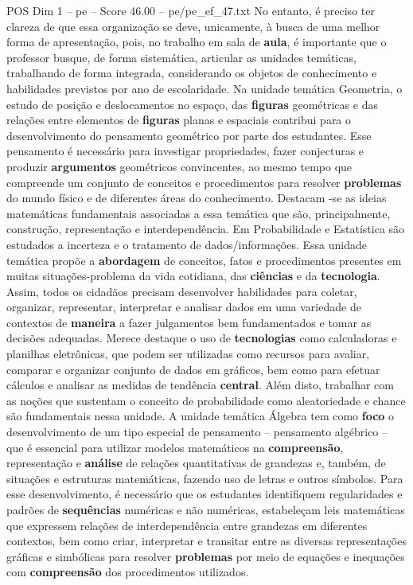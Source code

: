 \begin{textsample}{POS Dim 1 – pe – Score 46.00 – pe/pe\_ef\_47.txt}
No entanto, é preciso ter clareza de que essa organização se deve, unicamente, à busca de uma melhor forma de apresentação, pois, no trabalho em sala de \textbf{aula}, é importante que o professor busque, de forma sistemática, articular as unidades temáticas, trabalhando de forma integrada, considerando os objetos de conhecimento e habilidades previstos por ano de escolaridade.
Na unidade temática Geometria, o estudo de posição e deslocamentos no espaço, das \textbf{figuras} geométricas e das relações entre elementos de \textbf{figuras} planas e espaciais contribui para o desenvolvimento do pensamento geométrico por parte dos estudantes.
Esse pensamento é necessário para investigar propriedades, fazer conjecturas e produzir \textbf{argumentos} geométricos convincentes, ao mesmo tempo que compreende um conjunto de conceitos e procedimentos para resolver \textbf{problemas} do mundo físico e de diferentes áreas do conhecimento.
Destacam -se as ideias matemáticas fundamentais associadas a essa temática que são, principalmente, construção, representação e interdependência.
Em Probabilidade e Estatística são estudados a incerteza e o tratamento de dados/informações.
Essa unidade temática propõe a \textbf{abordagem} de conceitos, fatos e procedimentos presentes em muitas situações-problema da vida cotidiana, das \textbf{ciências} e da \textbf{tecnologia}.
Assim, todos os cidadãos precisam desenvolver habilidades para coletar, organizar, representar, interpretar e analisar dados em uma variedade de contextos de \textbf{maneira} a fazer julgamentos bem fundamentados e tomar as decisões adequadas.
Merece destaque o uso de \textbf{tecnologias} como calculadoras e planilhas eletrônicas, que podem ser utilizadas como recursos para avaliar, comparar e organizar conjunto de dados em gráficos, bem como para efetuar cálculos e analisar as medidas de tendência \textbf{central}.
Além disto, trabalhar com as noções que sustentam o conceito de probabilidade como aleatoriedade e chance são fundamentais nessa unidade.
A unidade temática Álgebra tem como \textbf{foco} o desenvolvimento de um tipo especial de pensamento – pensamento algébrico – que é essencial para utilizar modelos matemáticos na \textbf{compreensão}, representação e \textbf{análise} de relações quantitativas de grandezas e, também, de situações e estruturas matemáticas, fazendo uso de letras e outros símbolos.
Para esse desenvolvimento, é necessário que os estudantes identifiquem regularidades e padrões de \textbf{sequências} numéricas e não numéricas, estabeleçam leis matemáticas que expressem relações de interdependência entre grandezas em diferentes contextos, bem como criar, interpretar e transitar entre as diversas representações gráficas e simbólicas para resolver \textbf{problemas} por meio de equações e inequações com \textbf{compreensão} dos procedimentos utilizados.

\end{textsample}
